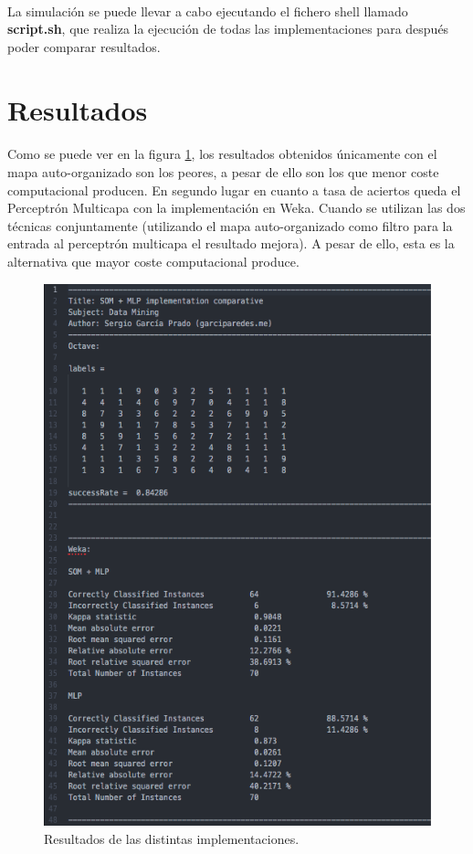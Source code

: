 \documentclass[10pt, a4paper,spanish]{article}
\begin{document}
			\paragraph{}
			La simulación se puede llevar a cabo ejecutando el fichero shell llamado \textbf{script.sh}, que realiza la ejecución de todas las implementaciones para después poder comparar resultados.

	\section{Resultados}

		\paragraph{}
		Como se puede ver en la figura \ref{fig:results}, los resultados obtenidos únicamente con el mapa auto-organizado son los peores, a pesar de ello son los que menor coste computacional producen. En segundo lugar en cuanto a tasa de aciertos queda el Perceptrón Multicapa con la implementación en Weka. Cuando se utilizan las dos técnicas conjuntamente (utilizando el mapa auto-organizado como filtro para la entrada al perceptrón multicapa el resultado mejora). A pesar de ello, esta es la alternativa que mayor coste computacional produce.

		\begin{figure}[htb]
			\centering
			\includegraphics[width=\textwidth]{results}
			\caption{Resultados de las distintas implementaciones.}
            \label{fig:results}
		\end{figure}
\end{document}
